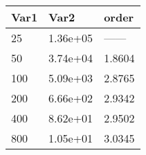 \begin{tabular}{lll}
Var1 & Var2 & order \\ 
\hline 
25 & 1.36e+05 & ------ \\ 
50 & 3.74e+04 & 1.8604 \\ 
100 & 5.09e+03 & 2.8765 \\ 
200 & 6.66e+02 & 2.9342 \\ 
400 & 8.62e+01 & 2.9502 \\ 
800 & 1.05e+01 & 3.0345 \\ 
\hline 
\end{tabular}